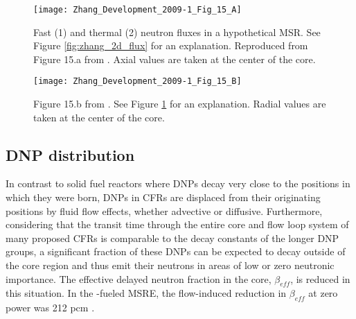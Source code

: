 \documentclass[review]{elsarticle}
\begin{document}
\begin{figure}[H]
   \centering
   \texttt{[image: Zhang\_Development\_2009-1\_Fig\_15\_A]}
   \caption{Fast (1) and thermal (2) neutron fluxes in a hypothetical MSR. See Figure 
            \ref{fig:zhang_2d_flux} for an explanation. Reproduced from Figure 15.a from
            \cite{zhang_development_2009-1}. 
               Axial
               values are taken at the center of the core.}
   \label{fig:zhang_axial_velocity_flux}
\end{figure}

\begin{figure}[H]
   \centering
   \texttt{[image: Zhang\_Development\_2009-1\_Fig\_15\_B]}
   \caption{Figure 15.b from \cite{zhang_development_2009-1}.
            See Figure \ref{fig:zhang_axial_velocity_flux} for an explanation.
               Radial 
               values are taken at the center of the core.}
   \label{fig:zhang_radial_velocity_flux}
\end{figure}

\subsection{DNP distribution} \label{ssec:dnpd}
In contrast to solid fuel reactors where DNPs decay
 very close to the positions in which they were born, DNPs in CFRs are displaced
 from their originating positions by fluid flow effects, whether advective or
 diffusive. Furthermore, considering that the transit time through the entire
 core and flow loop system of many proposed CFRs is comparable to the decay
 constants of the longer DNP groups, a significant fraction of these DNPs can be
expected to decay outside of the core region and thus emit their neutrons in areas
of low or zero neutronic importance. The effective delayed neutron fraction in the
 core, $\beta_{eff}$, is reduced in this situation. In the -fueled MSRE,
 the flow-induced reduction in $\beta_{eff}$ at zero power was 212 pcm \cite{delpech_benchmark_2003}.
\end{document}
